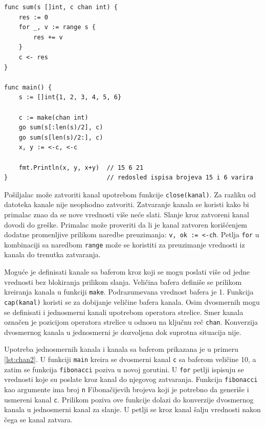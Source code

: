 \documentclass[12pt,oneside]{memoir}
\begin{document}
\begin{center}
\begin{lstlisting}[caption=Upotreba kanala, label={lst:chan1},  backgroundcolor=\color{background}]
func sum(s []int, c chan int) {
	res := 0
	for _, v := range s {
		res += v
	}
	c <- res 
}

func main() {
	s := []int{1, 2, 3, 4, 5, 6}

	c := make(chan int)
	go sum(s[:len(s)/2], c)
	go sum(s[len(s)/2:], c)
	x, y := <-c, <-c 

	fmt.Println(x, y, x+y)	// 15 6 21 
}							// redosled ispisa brojeva 15 i 6 varira
\end{lstlisting}
\end{center}

Pošiljalac može zatvoriti kanal upotrebom funkcije \texttt{close(kanal)}. Za razliku od datoteka kanale nije neophodno zatvoriti. Zatvaranje kanala se koristi kako bi primalac znao da se nove vrednosti više neće slati. Slanje kroz zatvoreni kanal dovodi do greške. Primalac može proveriti da li je kanal zatvoren korišćenjem dodatne promenljive prilikom naredbe preuzimanja: \texttt{v, ok := <-ch}. Petlja \texttt{for} u kombinaciji sa naredbom \texttt{range} može se koristiti za preuzimanje vrednosti iz kanala do trenutka zatvaranja. 

Moguće je definisati kanale sa baferom kroz koji se mogu poslati više od jedne vrednosti bez blokiranja prilikom slanja. Veličina bafera definiše se prilikom kreiranja kanala u funkciji \texttt{make}. Podrazumevana vrednost bafera je 1. Funkcija \texttt{cap(kanal)} koristi se za dobijanje veličine bafera kanala. Osim dvosmernih mogu se definisati i jednosmerni kanali upotrebom operatora strelice. Smer kanala označen je pozicijom operatora strelice u odnosu na ključnu reč \texttt{chan}. Konverzija dvosmernog kanala u jednosmerni je dozvoljena dok suprotna situacija nije. 

Upotreba jednosmernih kanala i kanala sa baferom prikazana je u primeru \ref{lst:chan2}. U funkciji \texttt{main} kreira se dvosmerni kanal \texttt{c} sa baferom veličine 10, a zatim se funkcija \texttt{fibonacci} poziva u novoj gorutini. U \texttt{for} petlji ispisuju se vrednosti koje su poslate kroz kanal do njegovog zatvaranja. Funkcija \texttt{fibonacci} kao argumente ima  broj \texttt{n} Fibonačijevih brojeva koji je potrebno da generiše i usmereni kanal \texttt{c}. Prilikom poziva ove funkcije dolazi do konverzije dvosmernog kanala u jednosmerni kanal za slanje. U petlji se kroz kanal šalju vrednosti nakon čega se kanal zatvara.
\end{document}
